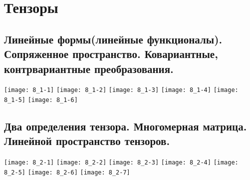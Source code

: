 \documentclass[../main.tex]{subfiles}
\begin{document}
\section{Тензоры}
	\subsection{Линейные формы(линейные функционалы). Сопряженное пространство. Ковариантные, контрвариантные преобразования.}
		\texttt{[image: 8\_1-1]}	
		\newline
		\texttt{[image: 8\_1-2]}	
		\newline
		\texttt{[image: 8\_1-3]}	
		\newline
		\texttt{[image: 8\_1-4]}	
		\newline
		\texttt{[image: 8\_1-5]}	
		\newline
		\texttt{[image: 8\_1-6]}	
		\newline
	\subsection{Два определения тензора. Многомерная матрица. Линейной пространство тензоров.}
	 		\texttt{[image: 8\_2-1]}	
		\newline
		\texttt{[image: 8\_2-2]}	
		\newline
		\texttt{[image: 8\_2-3]}	
		\newline
		\texttt{[image: 8\_2-4]}	
		\newline
		\texttt{[image: 8\_2-5]}	
		\newline
		\texttt{[image: 8\_2-6]}	
		\newline
		\texttt{[image: 8\_2-7]}	
		
		
\end{document}
